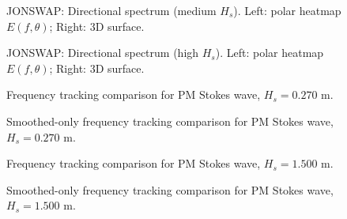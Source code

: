 \documentclass[11pt,letterpaper]{article}
\begin{document}
\begin{figure}[H]\centering
  \begin{minipage}{0.49\textwidth}
    \resizebox{\linewidth}{!}{}
  \end{minipage}\hfill
  \begin{minipage}{0.49\textwidth}
    \resizebox{\linewidth}{!}{}
  \end{minipage}
  \caption{JONSWAP: Directional spectrum (medium $H_s$). Left: polar heatmap $E(f,\theta)$; Right: 3D surface.}
  \label{fig:jonswap_spec_medium}
\end{figure}

\begin{figure}[H]\centering
  \begin{minipage}{0.49\textwidth}
    \resizebox{\linewidth}{!}{}
  \end{minipage}\hfill
  \begin{minipage}{0.49\textwidth}
    \resizebox{\linewidth}{!}{}
  \end{minipage}
  \caption{JONSWAP: Directional spectrum (high $H_s$). Left: polar heatmap $E(f,\theta)$; Right: 3D surface.}
  \label{fig:jonswap_spec_high}
\end{figure}


\begin{figure}[H]\centering
  \resizebox{\textwidth}{!}{}
  \caption{Frequency tracking comparison for PM Stokes wave, $H_s = 0.270$ m.}
  \label{fig:freqtrack_pmstokes_low}
\end{figure}
\begin{figure}[H]\centering
  \resizebox{\textwidth}{!}{}
  \caption{Smoothed-only frequency tracking comparison for PM Stokes wave, $H_s = 0.270$ m.}
  \label{fig:freqtrack_pmstokes_low_smooth}
\end{figure}

\begin{figure}[H]\centering
  \resizebox{\textwidth}{!}{}
  \caption{Frequency tracking comparison for PM Stokes wave, $H_s = 1.500$ m.}
  \label{fig:freqtrack_pmstokes_medium}
\end{figure}
\begin{figure}[H]\centering
  \resizebox{\textwidth}{!}{}
  \caption{Smoothed-only frequency tracking comparison for PM Stokes wave, $H_s = 1.500$ m.}
  \label{fig:freqtrack_pmstokes_medium_smooth}
\end{figure}
\end{document}
